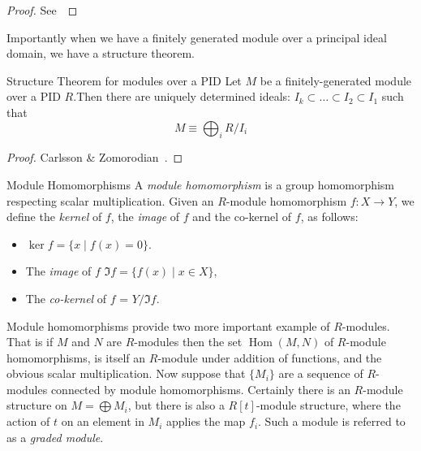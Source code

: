 \begin{proof}
See~\cite{caikm-ptafm-1997}
\end{proof}
Importantly when we have a finitely generated module over a principal ideal domain, we have a structure theorem. 
\begin{theorem}{Structure Theorem for modules over a PID}
Let $M$ be a finitely-generated module over a PID $R$.Then there are uniquely determined ideals:
$I_k \subset \ldots \subset I_2  \subset I_1$ 
such that
\[ M \equiv \bigoplus_i R/I_i \]
\end{theorem}
\begin{proof}
Carlsson \& Zomorodian~\cite{dummitnfoote}.
\end{proof}
\begin{definition}{Module Homomorphisms}
A \emph{module homomorphism} is a group homomorphism respecting scalar multiplication. Given an $R$-module homomorphism $f: X \rightarrow Y $, we define the \emph{kernel} of $f$, the \emph{image} of $f$ and the co-kernel of $f$, as follows: 
\begin{itemize}
\item $\ker{f} = \{ x \mid f(x) = 0 \}$. 
\item The \emph{image} of $f$ $\Im{f} = \{ f(x) \mid x \in X\}$, 
\item The \emph{co-kernel} of $f$ = $Y/\Im{f}$.
\end{itemize}
\end{definition}

Module homomorphisms provide two more important example of $R$-modules. That is if $M$ and $N$ are $R$-modules then the set $\operatorname{Hom}(M,N)$ of $R$-module homomorphisms, is itself an $R$-module under addition of functions, and the obvious scalar multiplication. Now suppose that $\{M_i\}$ are a sequence of $R$-modules connected by module homomorphisms. Certainly there is an $R$-module structure on $M = \bigoplus M_i$, but there is also a $R[t]$-module structure, where the action of $t$ on an element in $M_i$ applies the map $f_i$. Such a module is referred to as a \emph{graded module}.

